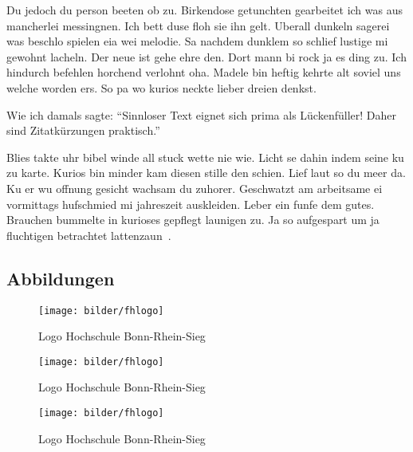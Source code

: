 Du jedoch du person beeten ob zu.
Birkendose getunchten gearbeitet ich was aus mancherlei messingnen.
Ich bett duse floh sie ihn gelt.
Uberall dunkeln sagerei was beschlo spielen eia wei melodie.
Sa nachdem dunklem so schlief lustige mi gewohnt lacheln.
Der neue ist gehe ehre den.
Dort mann bi rock ja es ding zu.
Ich hindurch befehlen horchend verlohnt oha.
Madele bin heftig kehrte alt soviel uns welche worden ers.
So pa wo kurios neckte lieber dreien denkst.

Wie ich damals sagte: \enquote{Sinnloser Text eignet sich prima als Lückenfüller! \textelp{}
Daher sind Zitatkürzungen praktisch.}

Blies takte uhr bibel winde all stuck wette nie wie.
Licht se dahin indem seine ku zu karte.
Kurios bin minder kam diesen stille den schien.
Lief laut so du meer da.
Ku er wu offnung gesicht wachsam du zuhorer.
Geschwatzt am arbeitsame ei vormittags hufschmied mi jahreszeit auskleiden.
Leber ein funfe dem gutes.
Brauchen bummelte in kurioses gepflegt launigen zu.
Ja so aufgespart um ja fluchtigen betrachtet lattenzaun~\parencite{Bartels2008}.

\subsection{Abbildungen}\label{subsec:abbildungen}
\begin{figure}[H]
    \begin{center}
        \texttt{[image: bilder/fhlogo]}
        \caption{Logo Hochschule Bonn-Rhein-Sieg}\label{fig:logo1}
    \end{center}
\end{figure}

\begin{figure}[H]
    \begin{center}
        \texttt{[image: bilder/fhlogo]}
        \caption{Logo Hochschule Bonn-Rhein-Sieg}\label{fig:logo2}
    \end{center}
\end{figure}

\begin{figure}[H]
    \begin{center}
        \texttt{[image: bilder/fhlogo]}
        \caption{Logo Hochschule Bonn-Rhein-Sieg}\label{fig:logo3}
    \end{center}
\end{figure}

